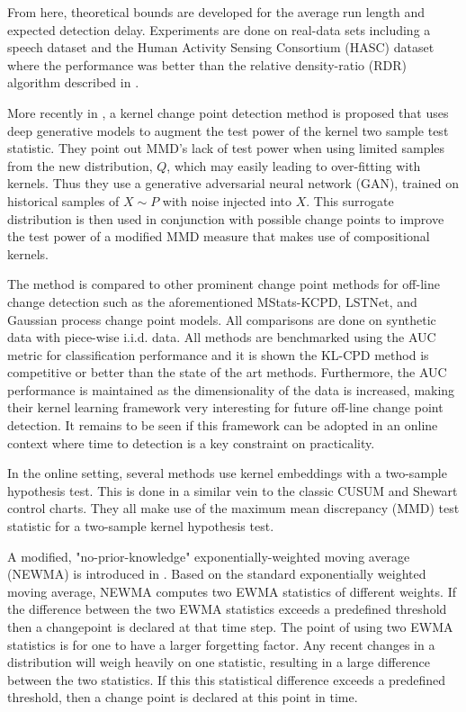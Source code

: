 From here, theoretical bounds are developed for the average run length and expected detection delay. Experiments are done on real-data sets including a speech dataset  and the Human Activity Sensing Consortium (HASC) dataset where the performance was better than the relative density-ratio (RDR) algorithm described in \cite{liu2013change}.

More recently in \cite{chang2019kernel}, a  kernel change point detection method is proposed that uses deep generative models to augment the test power of the kernel two sample test statistic. They point out MMD's lack of test power when using limited samples from the new distribution, $Q$, which may easily leading to over-fitting with kernels. Thus they use a generative adversarial neural network (GAN), trained on historical samples of $X \sim  P$  with noise injected into $X$. This surrogate distribution is then used in conjunction with possible change points to improve the test power of a modified MMD measure that makes use of compositional kernels.

The method is compared to other prominent change point methods for off-line  change detection such as the aforementioned MStats-KCPD, LSTNet, and Gaussian process change point models. All comparisons are done on synthetic data with piece-wise i.i.d. data. All methods are benchmarked using the AUC metric for classification performance and it is shown the KL-CPD method is competitive or better than the state of the art methods.  Furthermore, the AUC performance is maintained as the dimensionality of the data is increased, making their kernel learning framework very interesting for future off-line change point detection. It remains to be seen if this framework can be adopted in an online context where time to detection is a key constraint on practicality.

In the online setting, several methods use kernel embeddings with a two-sample hypothesis test. This is done in a similar vein to the classic CUSUM and Shewart control charts. They all make use of the maximum mean discrepancy (MMD) test statistic for a two-sample kernel hypothesis test. 


A modified, "no-prior-knowledge" exponentially-weighted moving average (NEWMA) is introduced in \cite{keriven2018newma}. Based on the standard exponentially weighted moving average, NEWMA computes two EWMA statistics of different weights. If the difference between the two EWMA statistics exceeds a predefined threshold then a changepoint is declared at that time step. The point of using two EWMA statistics is for one to have a larger forgetting factor. Any recent changes in a distribution will weigh heavily on one statistic, resulting in a large difference between the two statistics. If this this statistical difference exceeds a predefined threshold, then a change point is declared at this point in time.

